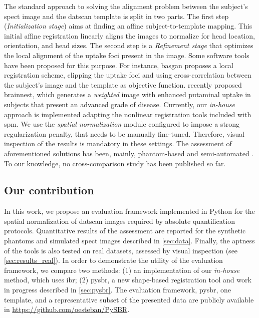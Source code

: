 \documentclass{frontiers}
\begin{document}
The standard approach to solving the alignment problem between the subject's
  \gls*{spect} image and the \gls*{datscan} template is split in two parts.
The first step (\emph{Initialization stage}) aims at finding an affine subject-to-template mapping.
This initial affine registration linearly aligns the images to normalize for 
   head location, orientation, and head sizes.
The second step is a \emph{Refinement stage} that optimizes the local alignment of
  the uptake foci present in the image.
Some software tools have been proposed for this purpose.
For instance, \gls*{basgan} proposes a local registration scheme, clipping the 
  uptake foci and using cross-correlation between the subject's image and 
  the template as objective function.
\citeauthor{ciarmiello_weighted_2013} recently proposed \gls*{brainnest}, which
  generates a \emph{weighted} image with enhanced putaminal uptake in
  subjects that present an advanced grade of disease.
\cbstart
Currently, our \emph{in-house} approach is implemented adapting the nonlinear registration
  tools included with \gls*{spm}.
We use the \emph{spatial normalization} module configured to impose a strong regularization penalty,
  that needs to be manually fine-tuned.
Therefore, visual inspection of the results is mandatory in these settings.
\cbend
The assessment of aforementioned solutions has been, mainly, phantom-based
  and semi-automated \citep{skanjeti_assessing_2013}.
To our knowledge, no cross-comparison study has been published so far.


\cbstart
\subsection{Our contribution}\label{sec:contribution}
In this work, we propose an evaluation framework implemented in Python for the
  spatial normalization of \gls*{datscan} images required by absolute quantification
  protocols.
Quantitative results of the assessment are reported for the synthetic
  phantoms and simulated \gls*{spect} images described in \autoref{sec:data}.
Finally, the aptness of the tools is also tested on real datasets,
  assessed by visual inspection (see \autoref{sec:results_real}).
In order to demonstrate the utility of the evaluation framework, we compare 
  two methods:
(1) an implementation of our \emph{in-house} method, which uses \gls*{ibr};
(2) \gls*{pysbr}, a new shape-based registration tool and
  work in progress described in \autoref{sec:pysbr}.
\cbend
The evaluation framework, \gls*{pysbr}, one template,
  and a representative subset of the presented data are publicly 
  available in \url{https://github.com/oesteban/PySBR}.
\end{document}
